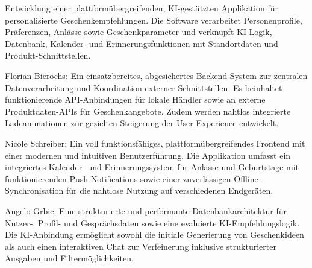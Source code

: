 
Entwicklung einer plattformübergreifenden, KI-gestützten Applikation für personalisierte Geschenkempfehlungen. Die Software verarbeitet Personenprofile, Präferenzen, Anlässe sowie Geschenkparameter und verknüpft KI-Logik, Datenbank, Kalender- und Erinnerungsfunktionen mit Standortdaten und Produkt-Schnittstellen.


Florian Bierochs: Ein einsatzbereites, abgesichertes Backend-System zur zentralen Datenverarbeitung und Koordination externer Schnittstellen. Es beinhaltet funktionierende API-Anbindungen für lokale Händler sowie an externe Produktdaten-APIs für Geschenkangebote. Zudem werden nahtlos integrierte Ladeanimationen zur gezielten Steigerung der User Experience entwickelt.

Nicole Schreiber: Ein voll funktionsfähiges, plattformübergreifendes Frontend mit einer modernen und intuitiven Benutzerführung. Die Applikation umfasst ein integriertes Kalender- und Erinnerungssystem für Anlässe und Geburtstage mit funktionierenden Push-Notifications sowie einer zuverlässigen Offline-Synchronisation für die nahtlose Nutzung auf verschiedenen Endgeräten.


Angelo Grbic: Eine strukturierte und performante Datenbankarchitektur für Nutzer-, Profil- und Gesprächsdaten sowie eine evaluierte KI-Empfehlungslogik. Die KI-Anbindung ermöglicht sowohl die initiale Generierung von Geschenkideen als auch einen interaktiven Chat zur Verfeinerung inklusive strukturierter Ausgaben und Filtermöglichkeiten.



